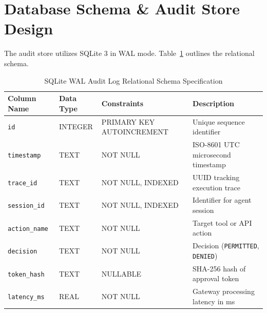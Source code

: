 \section{Database Schema \& Audit Store Design}
The audit store utilizes SQLite 3 in WAL mode. Table~\ref{tab:db_schema} outlines the relational schema.

\begin{table}[htbp]
\centering
\caption{SQLite WAL Audit Log Relational Schema Specification}
\label{tab:db_schema}
\begin{tabular}{l l l p{5.5cm}}
\toprule
\textbf{Column Name} & \textbf{Data Type} & \textbf{Constraints} & \textbf{Description} \\
\midrule
\texttt{id} & INTEGER & PRIMARY KEY AUTOINCREMENT & Unique sequence identifier \\
\texttt{timestamp} & TEXT & NOT NULL & ISO-8601 UTC microsecond timestamp \\
\texttt{trace\_id} & TEXT & NOT NULL, INDEXED & UUID tracking execution trace \\
\texttt{session\_id} & TEXT & NOT NULL, INDEXED & Identifier for agent session \\
\texttt{action\_name} & TEXT & NOT NULL & Target tool or API action \\
\texttt{decision} & TEXT & NOT NULL & Decision (\texttt{PERMITTED}, \texttt{DENIED}) \\
\texttt{token\_hash} & TEXT & NULLABLE & SHA-256 hash of approval token \\
\texttt{latency\_ms} & REAL & NOT NULL & Gateway processing latency in ms \\
\bottomrule
\end{tabular}
\end{table}

